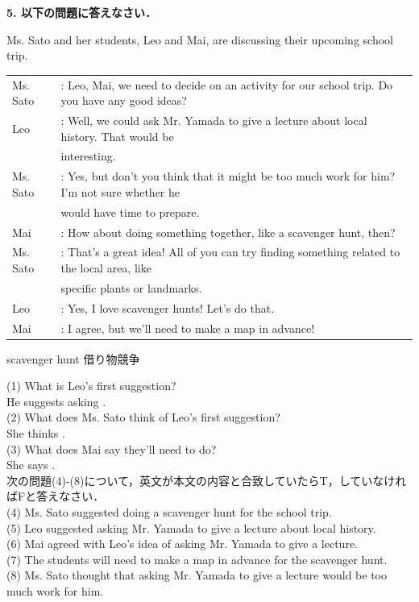 \noindent\textbf{5.  以下の問題に答えなさい．}\par
\begin{screen}
\: Ms. Sato and her students, Leo and Mai, are discussing their upcoming school trip.\\
\begin{tabular}{l l}
  Ms. Sato&: Leo, Mai, we need to decide on an activity for our school trip. Do you have any good ideas? \\
  Leo&: Well, we could ask Mr. Yamada to give a lecture about local history. That would be \\
  &interesting.\\
  Ms. Sato&: Yes, but don't you think that it might be too much work for him? I'm not sure whether he \\
  &would have time to prepare.\\
  Mai&: How about doing something together, like a scavenger hunt, then?\\
  Ms. Sato&: That's a great idea! All of you can try finding something related to the local area, like \\
  &specific plants or landmarks.\\
  Leo&: Yes, I love scavenger hunts! Let's do that.\\
  Mai&: I agree, but we'll need to make a map in advance!\\
\end{tabular}
scavenger hunt 借り物競争
\end{screen} 
(1) What is Leo's first suggestion?\\
He suggests asking \underbar{\hspace{6cm}} .\\
(2) What does Ms. Sato think of Leo's first suggestion?\\
She thinks \underbar{\hspace{6cm}} .\\
(3) What does Mai say they'll need to do?\\
She says \underbar{\hspace{6cm}} .\\
次の問題(4)-(8)について，英文が本文の内容と合致していたらT，していなければFと答えなさい．\\
(4) Ms. Sato suggested doing a scavenger hunt for the school trip.\\
(5) Leo suggested asking Mr. Yamada to give a lecture about local history.\\
(6) Mai agreed with Leo's idea of asking Mr. Yamada to give a lecture.\\
(7) The students will need to make a map in advance for the scavenger hunt.\\
(8) Ms. Sato thought that asking Mr. Yamada to give a lecture would be too much work for him.\\

